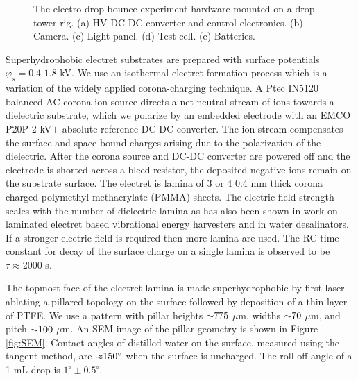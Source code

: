 \documentclass[aip,reprint, floatfix]{revtex4-1}
\begin{document}
\begin{figure}
    \centering
    \fontsize{12pt}{13pt}\selectfont
    \def\svgwidth{\columnwidth}
    \caption{The electro-drop bounce experiment hardware mounted on a drop tower rig. (a) HV DC-DC converter and control electronics. (b) Camera. (c) Light panel. (d) Test cell. (e) Batteries. \label{fig:rig}}
\end{figure}

Superhydrophobic electret substrates are prepared with surface potentials $\varphi_s = 0.4$-$1.8$ kV. We use an isothermal electret formation process which is a variation of the widely applied corona-charging technique. A Ptec IN5120 balanced AC corona ion source directs a net neutral stream of ions towards a dielectric substrate, which we polarize by an embedded electrode with an EMCO P20P $2$ kV$+$ absolute reference DC-DC converter. The ion stream compensates the surface and space bound charges arising due to the polarization of the dielectric. After the corona source and DC-DC converter are powered off and the electrode is shorted across a bleed resistor, the deposited negative ions remain on the substrate surface. The electret is lamina of 3 or 4 0.4 mm thick corona charged polymethyl methacrylate (PMMA) sheets. The electric field strength scales with the number of dielectric lamina as has also been shown in work on laminated electret based vibrational energy harvesters \cite{wada_stacking_2012} and in water desalinators. \cite{ni_desalination_2005} If a stronger electric field is required then more lamina are used. The RC time constant for decay of the surface charge on a single lamina is observed to be $\tau \approx 2000$ s.

The topmost face of the electret lamina is made superhydrophobic by first laser ablating a pillared topology  on the surface followed by deposition of a thin layer of PTFE. We use a pattern with pillar heights $\sim \hspace{-1mm} 775$ $\mu$m, widths $\sim \hspace{-1mm} 70$ $\mu$m, and pitch $\sim \hspace{-1mm} 100$ $\mu$m. An SEM image of the pillar geometry is shown in Figure \ref{fig:SEM}. Contact angles of distilled water on the surface, measured using the tangent method, are $\approx \hspace{-1mm} 150^{\circ}$ when the surface is uncharged. The roll-off angle of a 1 mL drop is $1^{\circ} \pm 0.5^{\circ}$.
\end{document}
